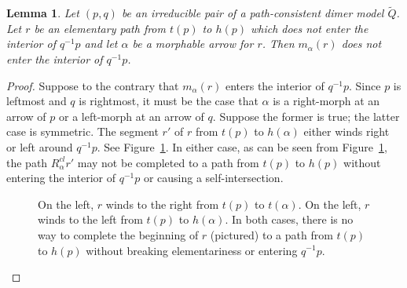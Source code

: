 \documentclass{article}
\newtheorem{lemma}[thm]{Lemma}
\theoremstyle{definition}
\begin{document}
\begin{lemma}\label{lem:ffl}
	Let $(p,q)$ be an irreducible pair of a path-consistent dimer model $\widetilde Q$. Let $r$ be an elementary path from $t(p)$ to $h(p)$ which does not enter the interior of $q^{-1}p$ and let $\alpha$ be a morphable arrow for $r$. Then $m_\alpha(r)$ does not enter the interior of $q^{-1}p$.
\end{lemma}
\begin{proof}
	Suppose to the contrary that $m_\alpha(r)$ enters the interior of $q^{-1}p$. Since $p$ is leftmost and $q$ is rightmost, it must be the case that $\alpha$ is a right-morph at an arrow of $p$ or a left-morph at an arrow of $q$. Suppose the former is true; the latter case is symmetric. The segment $r'$ of $r$ from $t(p)$ to $h(\alpha)$ either winds right or left around $q^{-1}p$. See Figure~\ref{fig:fffff}. In either case, as can be seen from Figure~\ref{fig:fffff}, the path $R_\alpha^{cl}r'$ may not be completed to a path from $t(p)$ to $h(p)$ without entering the interior of $q^{-1}p$ or causing a self-intersection.
	\def\svgwidth{300pt}
	\begin{figure}
		\centering
		
		\caption{On the left, $r$ winds to the right from $t(p)$ to $t(\alpha)$. On the left, $r$ winds to the left from $t(p)$ to $h(\alpha)$. In both cases, there is no way to complete the beginning of $r$ (pictured) to a path from $t(p)$ to $h(p)$ without breaking elementariness or entering $q^{-1}p$.}
		\label{fig:fffff}
	\end{figure}
\end{proof}
\end{document}
